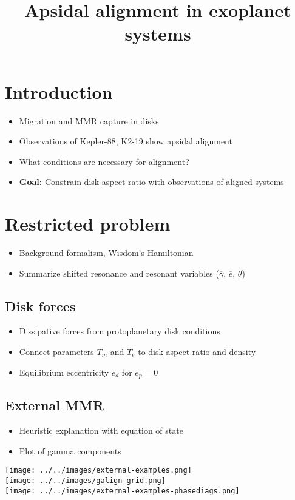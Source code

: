 \documentclass[12pt]{article}
\title{Apsidal alignment in exoplanet systems}
\newcommand{\fignote}[1]{{\color{blue} #1 }}
\newcommand{\ebar}{\overline{e}}
\newcommand{\gammabar}{\overline{\gamma}}
\newcommand{\thetabar}{\overline{\theta}}
\newcommand{\edisk}{e_d}
\begin{document}
\section{Introduction}
\begin{itemize}
\item Migration and MMR capture in disks
\item Observations of Kepler-88, K2-19 show apsidal alignment
\item What conditions are necessary for alignment?
\item \textbf{Goal:} Constrain disk aspect ratio with observations of aligned systems
\end{itemize}
\section{Restricted problem}
\begin{itemize}
\item Background formalism, Wisdom's Hamiltonian
\item Summarize shifted resonance and resonant variables ($\gammabar$,
  $\ebar$, $\thetabar$)
\end{itemize}
\subsection{Disk forces}
\begin{itemize}
\item Dissipative forces from protoplanetary disk conditions
\item Connect parameters $T_m$ and $T_e$ to disk aspect ratio and density
\item Equilibrium eccentricity $\edisk$ for $e_p=0$
\end{itemize}
\subsection{External MMR}
\begin{itemize}
\item Heuristic explanation with equation of state
\item \fignote{Plot of gamma components}
\end{itemize}
\texttt{[image: ../../images/external-examples.png]}\\
\texttt{[image: ../../images/galign-grid.png]}\\
\texttt{[image: ../../images/external-examples-phasediags.png]}
\end{document}
